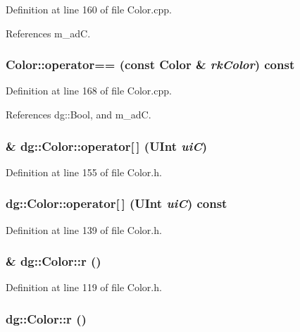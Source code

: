 Definition at line 160 of file Color.cpp.

References m\_\-ad\-C.
\subsubsection{ Color::operator== (const Color \& {\em rk\-Color}) const}\label{classdg_1_1Color_a26}




Definition at line 168 of file Color.cpp.

References dg::Bool, and m\_\-ad\-C.
\subsubsection{ \& dg::Color::operator[$\,$] ({\bf UInt} {\em ui\-C})\hspace{0.3cm}{\tt  [inline]}}\label{classdg_1_1Color_a14}




Definition at line 155 of file Color.h.
\subsubsection{ dg::Color::operator[$\,$] ({\bf UInt} {\em ui\-C}) const\hspace{0.3cm}{\tt  [inline]}}\label{classdg_1_1Color_a12}




Definition at line 139 of file Color.h.
\subsubsection{ \& dg::Color::r ()\hspace{0.3cm}{\tt  [inline]}}\label{classdg_1_1Color_a7}




Definition at line 119 of file Color.h.
\subsubsection{ dg::Color::r ()\hspace{0.3cm}{\tt  [inline]}}\label{classdg_1_1Color_a3}




